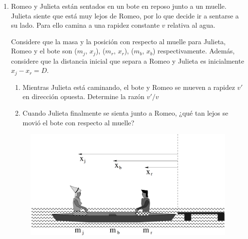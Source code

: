 \documentclass[letterpaper,11pt]{article}
\begin{document}
\begin{enumerate}
\item Romeo y Julieta están sentados en un bote en reposo junto a un muelle. Julieta siente que está muy lejos de Romeo, por lo que decide ir a sentarse a su lado. Para ello camina a una rapidez constante $v$ relativa al agua.

Considere que la masa y la posición con respecto al muelle para Julieta, Romeo y el bote son ($m_j$, $x_j$), ($m_r$, $x_r$), ($m_b$, $x_b$) respectivamente. Además, considere que la distancia inicial que separa a Romeo y Julieta es inicialmente $x_j-x_r=D$.

\begin{multicols}{2}
    \begin{enumerate}
        \item Mientras Julieta está caminando, el bote y Romeo se mueven a rapidez $v'$ en dirección opuesta. Determine la razón $v'/v$
        
        \item Cuando Julieta finalmente se sienta junto a Romeo, ¿qué tan lejos se movió el bote con respecto al muelle?
    \end{enumerate}
    
    \columnbreak
    
    \begin{figure}[H]
        \centering
        \includegraphics[width=0.7\linewidth]{2021-1/Imagenes/ejercicios/romeo-julieta.PNG}
    \end{figure}

\end{multicols}

%   

\end{enumerate}
\end{document}

